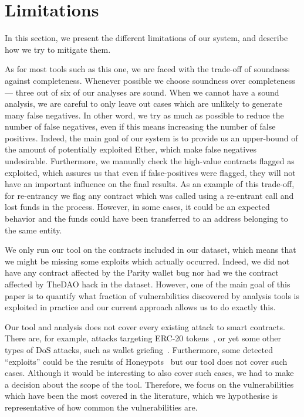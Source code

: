 \section{Limitations}
\label{sec:limitations} 
In this section, we present the different limitations of our system, and describe how we try to mitigate them.

 As for most tools such as this one, we are faced with the trade-off of soundness against completeness. Whenever possible we choose soundness over completeness --- three out of six of our analyses are sound. When we cannot have a sound analysis, we are careful to only leave out cases which are unlikely to generate many false negatives. In other word, we try as much as possible to reduce the number of false negatives, even if this means increasing the number of false positives. Indeed, the main goal of our system is to provide us an upper-bound of the amount of potentially exploited Ether, which make false negatives undesirable. Furthermore, we manually check the high-value contracts flagged as exploited, which assures us that even if false-positives were flagged, they will not have an important influence on the final results. As an example of this trade-off, for re-entrancy we flag any contract which was called using a re-entrant call and lost funds in the process. However, in some cases, it could be an expected behavior and the funds could have been transferred to an address belonging to the same entity.

 We only run our tool on the contracts included in our dataset, which means that we might be missing some exploits which actually occurred. Indeed, we did not have any contract affected by the Parity wallet bug nor had we the contract affected by TheDAO hack in the dataset. However, one of the main goal of this paper is to quantify what fraction of vulnerabilities discovered by analysis tools is exploited in practice and our current approach allows us to do exactly this.

 Our tool and analysis does not cover every existing attack to smart contracts. There are, for example, attacks targeting ERC-20 tokens~\cite{8802438}, or yet some other types of DoS attacks, such as wallet griefing~\cite{Grech2018}.
Furthermore, some detected ``exploits'' could be the results of Honeypots~\cite{236240} but our tool does not cover such cases.
Although it would be interesting to also cover such cases, we had to make a decision about the scope of the tool. Therefore, we focus on the vulnerabilities which have been the most covered in the literature, which we hypothesise is representative of how common the vulnerabilities are.
